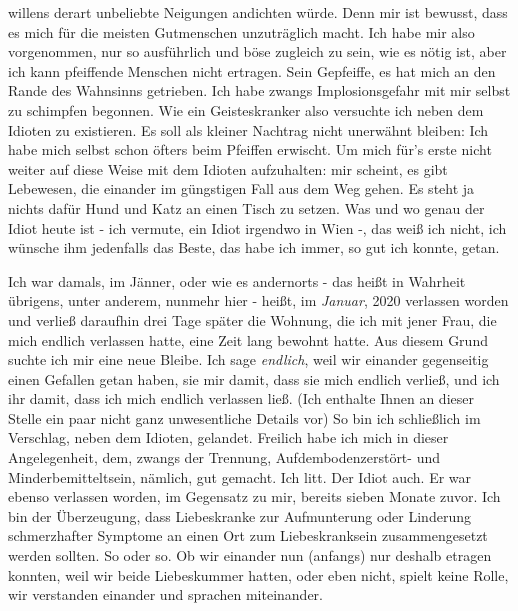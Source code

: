 \documentclass{scrbook}
\begin{document}
willens derart unbeliebte Neigungen andichten würde. Denn mir ist bewusst,
dass es mich für die meisten Gutmenschen unzuträglich macht. Ich habe mir
also vorgenommen, nur so ausführlich und böse zugleich zu sein, wie es nötig
ist, aber ich kann pfeiffende Menschen nicht ertragen. Sein Gepfeiffe, es hat
mich an den Rande des Wahnsinns getrieben. Ich habe zwangs Implosionsgefahr
mit mir selbst zu schimpfen begonnen. Wie ein Geisteskranker also versuchte
ich neben dem Idioten zu existieren. Es soll als kleiner Nachtrag nicht
unerwähnt bleiben: Ich habe mich selbst schon öfters beim Pfeiffen erwischt.
Um mich für's erste nicht weiter auf diese Weise mit dem Idioten aufzuhalten:
mir scheint, es gibt Lebewesen, die einander im güngstigen Fall aus dem Weg
gehen. Es steht ja nichts dafür Hund und Katz an einen Tisch zu setzen. Was
und wo genau der Idiot heute ist - ich vermute, ein Idiot irgendwo in Wien -,
das weiß ich nicht, ich wünsche ihm jedenfalls das Beste, das habe ich immer,
so gut ich konnte, getan. 

Ich war damals, im Jänner, oder wie es andernorts - das heißt in Wahrheit
übrigens, unter anderem, nunmehr hier - heißt, im \emph{Januar}, 2020
verlassen worden und verließ daraufhin drei Tage später die Wohnung, die ich
mit jener Frau, die mich endlich verlassen hatte, eine Zeit lang bewohnt
hatte. Aus diesem Grund suchte ich mir eine neue Bleibe. Ich sage
\textit{endlich}, weil wir einander gegenseitig einen Gefallen getan haben,
sie mir damit, dass sie mich endlich verließ, und ich ihr damit, dass ich
mich endlich verlassen ließ. (Ich enthalte Ihnen an dieser Stelle ein paar
nicht ganz unwesentliche Details vor) So bin ich schließlich im Verschlag,
neben dem Idioten, gelandet. Freilich habe ich mich in dieser Angelegenheit,
dem, zwangs der Trennung, Aufdembodenzerstört- und Minderbemitteltsein,
nämlich, gut gemacht. Ich litt. Der Idiot auch. Er war ebenso verlassen
worden, im Gegensatz zu mir, bereits sieben Monate zuvor. Ich bin der
Überzeugung, dass Liebeskranke zur Aufmunterung oder Linderung schmerzhafter
Symptome an einen Ort zum Liebeskranksein zusammengesetzt werden sollten. So
oder so. Ob wir einander nun (anfangs) nur deshalb etragen konnten, weil wir
beide Liebeskummer hatten, oder eben nicht, spielt keine Rolle, wir
verstanden einander und sprachen miteinander. 




\end{document}
